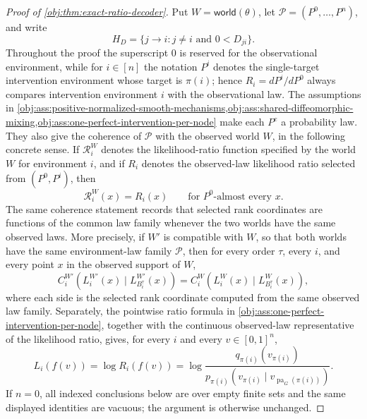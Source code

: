 \documentclass[11pt]{article}
\begin{document}
\begin{proof}[Proof of \cref{obj:thm:exact-ratio-decoder}]
Put \(W=\mathsf{world}(\theta)\), let \(\mathcal P=(P^0,\ldots,P^n)\), and write
\[
H_D=\{j\to i:j\ne i\text{ and }0<D_{ji}\}.
\]
Throughout the proof the superscript \(0\) is reserved for the observational environment, while for \(i\in[n]\) the notation \(P^i\) denotes the single-target intervention environment whose target is \(\pi(i)\); hence \(R_i=dP^i/dP^0\) always compares intervention environment \(i\) with the observational law. The assumptions in \cref{obj:ass:positive-normalized-smooth-mechanisms,obj:ass:shared-diffeomorphic-mixing,obj:ass:one-perfect-intervention-per-node} make each \(P^e\) a probability law. They also give the coherence of \(\mathcal P\) with the observed world \(W\), in the following concrete sense. If \(\mathcal R_i^W\) denotes the likelihood-ratio function specified by the world \(W\) for environment \(i\), and if \(R_i\) denotes the observed-law likelihood ratio selected from \((P^0,
P^i)\), then
\[
\mathcal R_i^W(x)=R_i(x)
\qquad\text{for }P^0\text{-almost every }x.
\]
The same coherence statement records that selected rank coordinates are functions of the common law family whenever the two worlds have the same observed laws. More precisely, if \(W'\) is compatible with \(W\), so that both worlds have the same environment-law family \(\mathcal P\), then for every order \(\tau\), every \(i\), and every point \(x\) in the observed support of \(W\),
\[
C_i^{W'}\!\left(L_i^{W'}(x)\mid L_{B_i^\tau}^{W'}(x)\right)
=
C_i^{W}\!\left(L_i^{W}(x)\mid L_{B_i^\tau}^{W}(x)\right),
\]
where each side is the selected rank coordinate computed from the same observed law family. Separately, the pointwise ratio formula in \cref{obj:ass:one-perfect-intervention-per-node}, together with the continuous observed-law representative of the likelihood ratio, gives, for every \(i\) and every \(v\in[0,1]^n\),
\begin{equation}
L_i(f(v))
=
\log R_i(f(v))
=
\log
\frac{q_{\pi(i)}(v_{\pi(i)})}
{p_{\pi(i)}(v_{\pi(i)}\mid v_{\operatorname{pa}_G(\pi(i))})}.
\label{eq:exact-ratio-decoder-log-ratio}
\end{equation}
If \(n=0\), all indexed conclusions below are over empty finite sets and the same displayed identities are vacuous; the argument is otherwise unchanged. %


\end{proof}
\end{document}
